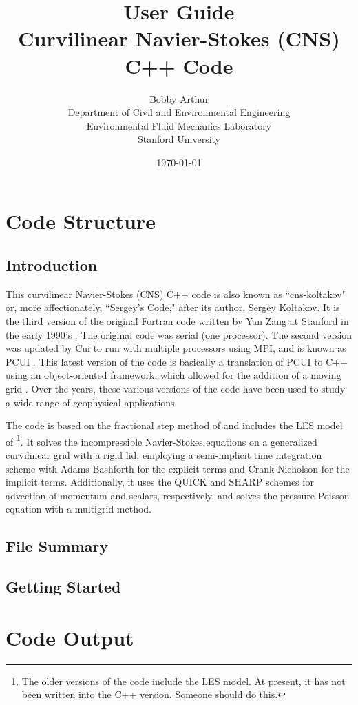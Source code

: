 \documentclass[12pt]{report}
\title{User Guide\\ \vspace{0.1in} \large{Curvilinear Navier-Stokes (CNS) C++ Code}}
\author{Bobby Arthur \\ Department of Civil and Environmental Engineering
                     \\ Environmental Fluid Mechanics Laboratory
                     \\ Stanford University}
\date{\today}
\begin{document}
\maketitle
\tableofcontents

\chapter{Code Structure}

\section{Introduction}
This curvilinear Navier-Stokes (CNS) C++ code is also known as ``cns-koltakov" or, more affectionately, ``Sergey's Code," after its author, Sergey Koltakov. It is the third version of the original Fortran code written by Yan Zang at Stanford in the early 1990's \citep{zang1994}. The original code was serial (one processor). The second version was updated by Cui to run with multiple processors using MPI, and is known as PCUI \citep{cui2001}. This latest version of the code is basically a translation of PCUI to C++ using an object-oriented framework, which allowed for the addition of a moving grid \citep{koltakov2012}. Over the years, these various versions of the code have been used to study a wide range of geophysical applications.

The code is based on the fractional step method of \citet{zang1994} and includes the LES model of \citet{zang1993}\footnote{The older versions of the code include the LES model. At present, it has not been written into the C++ version. Someone should do this.}. It solves the incompressible Navier-Stokes equations on a generalized curvilinear grid with a rigid lid, employing a semi-implicit time integration scheme with Adams-Bashforth for the explicit terms and Crank-Nicholson for the implicit terms. Additionally, it uses the QUICK and SHARP schemes for advection of momentum and scalars, respectively, and solves the pressure Poisson equation with a multigrid method. 

\section{File Summary}

\section{Getting Started}
 
\chapter{Code Output}
\end{document}
